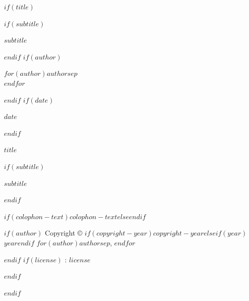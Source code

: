 \documentclass[
  $if(fontsize)$$fontsize$$else$11pt$endif$,
  twoside,
  $if(openany)$openany$else$openright$endif$
]{book}
\begin{document}
\pagestyle{empty}
\hypersetup{pageanchor=false}

$if(title)$
\thispagestyle{empty}
\drawcoverborder
\begin{center}
  \vspace*{\fill}
  \begin{minipage}{0.88\textwidth}
    \centering
    $if(subtitle)$
    \vspace{1em}
    {\Large $subtitle$\par}
    $endif$
    $if(author)$
    \vspace{2em}
    {\Large $for(author)$$author$$sep$ \\ $endfor$\par}
    $endif$
    $if(date)$
    \vspace{1em}
    {\large $date$\par}
    $endif$
  \end{minipage}
  \vspace*{\fill}
\end{center}
\clearpage
\blankpage

\thispagestyle{empty}
\begin{center}
  \vspace*{\fill}
  {\Huge\bfseries $title$\par}
  $if(subtitle)$
  \vspace{1em}
  {\Large $subtitle$\par}
  $endif$
  \vspace*{\fill}
\end{center}
\clearpage

\thispagestyle{empty}
\null\vfill
{\small
  \begin{flushleft}
    $if(colophon-text)$$colophon-text$$else$$endif$\par
  \end{flushleft}
  \vfill
  \begin{flushleft}
    $if(author)$
    Copyright © $if(copyright-year)$$copyright-year$$elseif(year)$$year$$endif$ $for(author)$$author$$sep$, $endfor$\par
    $endif$
    $if(license)$
    \licensename: $license$\par
    $endif$
  \end{flushleft}
}
\clearpage
$endif$

\handoutsclearchapterpage
\frontmatter
\hypersetup{pageanchor=true}
\pagestyle{frontmattersection}
\end{document}
